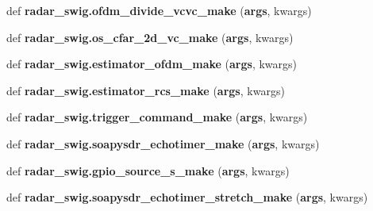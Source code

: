 \begin{DoxyCompactItemize}
\item 
def {\bf radar\+\_\+swig.\+ofdm\+\_\+divide\+\_\+vcvc\+\_\+make} ({\bf args}, kwargs)
\item 
def {\bf radar\+\_\+swig.\+os\+\_\+cfar\+\_\+2d\+\_\+vc\+\_\+make} ({\bf args}, kwargs)
\item 
def {\bf radar\+\_\+swig.\+estimator\+\_\+ofdm\+\_\+make} ({\bf args}, kwargs)
\item 
def {\bf radar\+\_\+swig.\+estimator\+\_\+rcs\+\_\+make} ({\bf args}, kwargs)
\item 
def {\bf radar\+\_\+swig.\+trigger\+\_\+command\+\_\+make} ({\bf args}, kwargs)
\item 
def {\bf radar\+\_\+swig.\+soapysdr\+\_\+echotimer\+\_\+make} ({\bf args}, kwargs)
\item 
def {\bf radar\+\_\+swig.\+gpio\+\_\+source\+\_\+s\+\_\+make} ({\bf args}, kwargs)
\item 
def {\bf radar\+\_\+swig.\+soapysdr\+\_\+echotimer\+\_\+stretch\+\_\+make} ({\bf args}, kwargs)
\end{DoxyCompactItemize}
